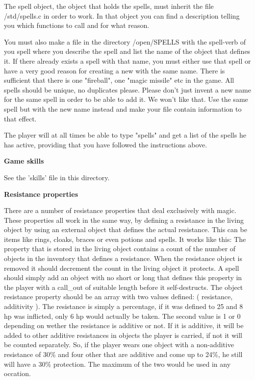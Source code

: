 The spell object, the object that holds the spells, must inherit the
file /std/spells.c in order to work. In that object you can find a
description telling you which functions to call and for what reason.

You must also make a file in the directory /open/SPELLS with the
spell-verb of you spell where you describe the spell and list the name
of the object that defines it. If there already exists a spell with
that name, you must either use that spell or have a very good reason
for creating a new with the same name. There is sufficient that there
is one "fireball", one "magic missile" etc in the game. All spells
should be unique, no duplicates please. Please don't just invent a new
name for the same spell in order to be able to add it. We won't like that.
Use the same spell but with the new name instead and make your file
contain information to that effect.

The player will at all times be able to type "spells" and get a list
of the spells he has active, providing that you have followed the
instructions above. 

{\bf Game skills}


See the 'skills' file in this directory.

{\bf Resistance properties}


There are a number of resistance properties that deal exclusively with
magic. These properties all work in the same way, by defining a
resistance in the living object by using an external object that
defines the actual resistance. This can be items like rings, cloaks,
braces or even potions and spells. It works like this: The property
that is stored in the living object contains a count of the number of
objects in the inventory that defines a resistance. When the
resistance object is removed it should decrement the count in the
living object it protects. A spell should simply add an object with no
short or long that defines this property in the player with a call\_out
of suitable length before it self-destructs.  The object resistance
property should be an array with two values defined: ({ resistance,
additivity }). The resistance is simply a percentage, if it was
defined to 25 and 8 hp was inflicted, only 6 hp would actually be
taken. The second value is 1 or 0 depending on wether the resistance
is additive or not. If it is additive, it will be added to other
additive resistances in objects the player is carried, if not it will
be counted separately. So, if the player wears one object with a
non-additive resistance of 30\% and four other that are additive and
come up to 24\%, he still will have a 30\% protection. The maximum of
the two would be used in any occation.

